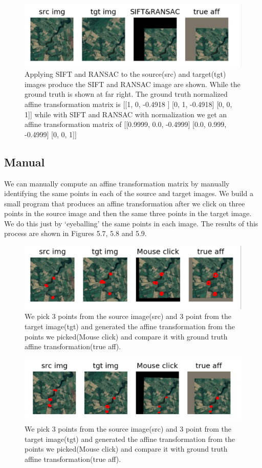 \begin{figure}
\centering
\includegraphics[width = 5.0in]{figs/sift_60down_60right}
\caption{Applying SIFT and RANSAC to the source(src) and target(tgt) images produce the SIFT and RANSAC image are shown. While the ground truth is shown at far right. The ground truth normalized affine transformation matrix is [[1, 0, -0.4918 ] [0, 1, -0.4918] [0, 0, 1]] while with SIFT and RANSAC with normalization we get an affine transformation matrix of [[0.9999, 0.0, -0.4999] [0.0, 0.999, -0.4999] [0, 0, 1]]}
\end{figure}


\subsection{Manual}
We can manually compute an affine transformation matrix by manually identifying the same points in each of the source and target images. We build a small program that produces an affine transformation after we click on three points in the source image and then the same three points in the target image. We do this just by `eyeballing' the same points in each image. The results of this process are shown in Figures 5.7, 5.8 and 5.9.\\
\begin{figure}
\centering
\includegraphics[width = 5.0in]{figs/click_20up_20right}
\caption{We pick 3 points from the source image(src) and 3 point from the target image(tgt) and generated the affine transformation from the points we picked(Mouse click) and compare it with  ground truth affine transformation(true aff).}
\end{figure}
  
 \begin{figure}
\centering
\includegraphics[width = 5.0in]{figs/click_40down_40right}
\caption{We pick 3 points from the source image(src) and 3 point from the target image(tgt) and generated the affine transformation from the points we picked(Mouse click) and compare it with  ground truth affine transformation(true aff).}
\end{figure}

